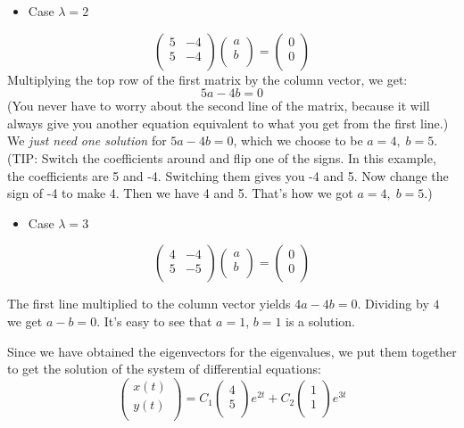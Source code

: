 \documentclass[12pt]{report}
\begin{document}
\begin{itemize}
\item  Case $\lambda = 2$
\end{itemize}
$$\begin{pmatrix} 5 & -4 \\ 5 & -4 \\ \end{pmatrix} \begin{pmatrix} a \\ b \\ \end{pmatrix} =\begin{pmatrix} 0 \\ 0 \\ \end{pmatrix} $$
Multiplying the top row of the first matrix by the column vector, we get:
$$5a-4b=0$$
(You never have to worry about the second line of the matrix, because it will always give you another equation equivalent to what you get from the first line.)
We \textit{just need one solution} for $5a-4b=0$, which we choose to be $a=4, \; b=5$. (TIP: Switch the coefficients around and flip one of the signs. In this example, the coefficients are 5 and -4. Switching them gives you -4 and 5. Now change the sign of -4 to make 4. Then we have 4 and 5. That's how we got $a=4, \; b=5$.)

\begin{itemize}
\item  Case $\lambda = 3$
\end{itemize}
$$\begin{pmatrix} 4 & -4 \\ 5 & -5 \\ \end{pmatrix} \begin{pmatrix} a \\ b \\ \end{pmatrix} =\begin{pmatrix} 0 \\ 0 \\ \end{pmatrix} $$

The first line multiplied to the column vector yields $4a-4b=0$. Dividing by $4$ we get $a-b=0$. It's easy to see that $a=1$, $b=1$ is a solution.

Since we have obtained the eigenvectors for the eigenvalues, we put them together to get the solution of the system of differential equations:
$$\begin{pmatrix} x(t) \\ y(t) \\ \end{pmatrix} = C_1 \begin{pmatrix} 4 \\ 5 \\ \end{pmatrix} e^{2t} + C_2 \begin{pmatrix} 1 \\ 1 \\ \end{pmatrix} e^{3t} $$
\end{document}
